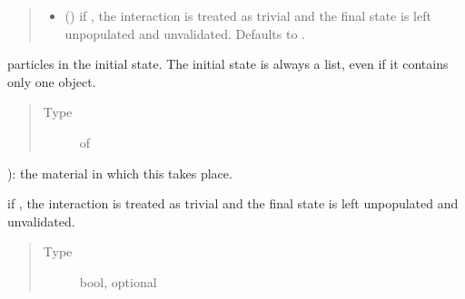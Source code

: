 \documentclass[letterpaper,10pt,english]{sphinxmanual}
\begin{document}
\begin{fulllineitems}
\begin{quote}
\begin{description}
\begin{itemize}
\item {} 
 (\sphinxstyleliteralemphasis{\sphinxupquote{, }}) \textendash{} if , the interaction is treated as
trivial and the final state is left unpopulated and unvalidated.
Defaults to .

\end{itemize}

\end{description}\end{quote}

\begin{fulllineitems}
\label{\detokenize{code_structure:scdc.interaction.Interaction.initial_state}}
particles in the
initial state. The initial state is always a list, even if it
contains only one object.
\begin{quote}\begin{description}
\item[{Type}] \leavevmode
{} of 

\end{description}\end{quote}

\end{fulllineitems}



\begin{fulllineitems}
): the material in which this takes place.

\end{fulllineitems}


\begin{fulllineitems}
\label{\detokenize{code_structure:scdc.interaction.Interaction.final}}
if , the interaction is treated as
trivial and the final state is left unpopulated and unvalidated.
\begin{quote}\begin{description}
\item[{Type}] \leavevmode
bool, optional


\end{description}
\end{quote}
\end{fulllineitems}
\end{fulllineitems}
\end{document}
